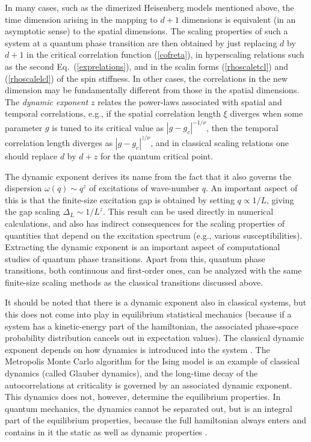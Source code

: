 \documentclass[draft,numberedheadings]{aipproc}
\begin{document}
In many cases, such as the dimerized Heisenberg models mentioned above, the time dimension arising in the mapping to $d+1$ dimensions is equivalent (in 
an asymptotic sense) to the spatial dimensions. The scaling properties of such a system at a quantum phase transition are then obtained by just 
replacing $d$ by $d+1$ in the critical correlation function (\ref{cofreta}), in hyperscaling relations such as the second Eq.~(\ref{exprelations}),
and in the scalin forms (\ref{rhoscaletcl}) and (\ref{rhoscalelcl}) of the spin stiffness. In other cases, the correlations in the new dimension may be 
fundamentally different from those in the spatial dimensions. The {\it dynamic exponent} $z$ relates the power-laws associated with spatial and temporal 
correlations, e.g., if the spatial correlation length $\xi$ diverges when some parameter $g$ is tuned to its critical value as $|g-g_c|^{-1/\nu}$, then 
the temporal correlation length diverges as $|g-g_c|^{z/\nu}$, and in classical scaling relations one should replace $d$ by $d+z$ for the quantum
critical point. 

The dynamic exponent derives its name 
from the fact that it also governs the dispersion $\omega(q) \sim q^z$ of excitations of wave-number $q$. An important aspect of this is that the finite-size 
excitation gap is obtained by setting $q \propto 1/L$, giving the gap scaling $\Delta_L \sim 1/L^z$. This result can be used directly in numerical
calculations, and also has indirect consequences for the scaling properties of quantities that depend on the excitation spectrum (e.g., various 
susceptibilities). Extracting the dynamic exponent is an important aspect of computational studies of quantum phase transitions. Apart from this, 
quantum phase transitions, both continuous and first-order ones, can be analyzed with the same finite-size scaling methods as the classical transitions 
discussed above.

It should be noted that there is a dynamic exponent also in classical systems, but this does not come into play in equilibrium statistical mechanics
(because if a system has a kinetic-energy part of the hamiltonian, the associated phase-space probability distribution cancels out in expectation 
values). The classical dynamic exponent depends on how dynamics is introduced into the system \cite{halperin}. The Metropolis Monte Carlo algorithm 
for the Ising model is an example of classical dynamics (called Glauber dynamics), and the long-time decay of the autocorrelations at criticality is governed 
by an associated dynamic exponent. This dynamics does not, however, determine the equilibrium properties. In quantum mechanics, the dynamics cannot be 
separated out, but is an integral part of the equilibrium properties, because the full hamiltonian always enters and contains in it the static as well 
as dynamic properties \cite{sondhirpm}.
\end{document}
